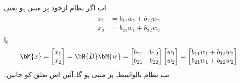 اب اگر  نظام ازخود  پر مبنی ہو یعنی
 \begin{gather}
\begin{aligned}\label{مساوات_الجبرا_خطی_تعلق_پ}
x_1&=b_{11}w_1+b_{12}w_2\\
x_2&=b_{21}w_1+b_{22}w_2
\end{aligned}
\end{gather}
یا
\begin{align}\label{مساوات_الجبرا_خطی_تعلق_ت}
\bM{x}=\begin{bmatrix} x_1\\x_2 \end{bmatrix}=\bM{B}\bM{w}=\begin{bmatrix} b_{11}& b_{12}\\b_{21}&b_{22} \end{bmatrix}\begin{bmatrix} w_1\\ w_2 \end{bmatrix}=\begin{bmatrix} b_{11}w_1 + b_{12}w_2\\  b_{21}w_1 + b_{22}w_2\end{bmatrix}
\end{align}
تب  نظام بالواسطہ   پر مبنی ہو گا۔آئیں اس تعلق کو جانیں۔

